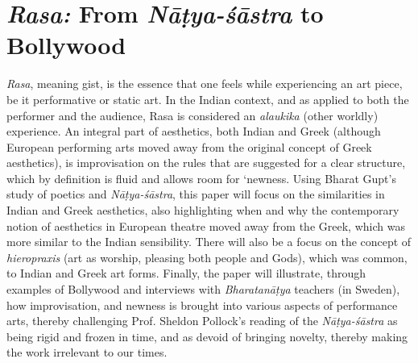 \chapter[{\sl Rasa:} From \textsl{Nāṭya-śāstra} to Bollywood]{{\sl Rasa:} From \textsl{Nāṭya-śāstra} to Bollywood}\label{chapter\thechapter:begin}

\textsl{Rasa}, meaning gist, is the essence that one feels while experiencing an art piece, be it performative or static art. In the Indian context, and as applied to both the performer and the audience, Rasa is considered an \textsl{alaukika} (other worldly) experience. An integral part of aesthetics, both Indian and Greek (although European performing arts moved away from the original concept of Greek aesthetics), is improvisation on the rules that are suggested for a clear structure, which by definition is fluid and allows room for ‘newness. Using Bharat Gupt’s study of poetics and \textsl{Nāṭya-śāstra}, this paper will focus on the similarities in Indian and Greek aesthetics, also highlighting when and why the contemporary notion of aesthetics in European theatre moved away from the Greek, which was more similar to the Indian sensibility. There will also be a focus on the concept of \textsl{hieropraxis} (art as worship, pleasing both people and Gods), which was common, to Indian and Greek art forms. Finally, the paper will illustrate, through examples of Bollywood and interviews with \textsl{Bharatanāṭya} teachers (in Sweden), how improvisation, and newness is brought into various aspects of performance arts, thereby challenging Prof. Sheldon Pollock’s reading of the \textsl{Nāṭya-śāstra} as being rigid and frozen in time, and as devoid of bringing novelty, thereby making the work irrelevant to our times. 

\newpage

